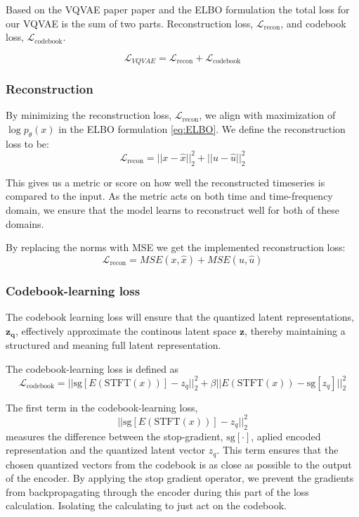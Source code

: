 Based on the VQVAE paper\cite{neuvqvae} paper and the ELBO formulation the total loss for our VQVAE is the sum of two parts. Reconstruction loss, $\mathcal{L}_{\text{recon}}$, and codebook loss, $\mathcal{L}_\text{codebook}$.

\begin{equation}
    \mathcal{L}_{VQVAE} = \mathcal{L}_\text{recon} + \mathcal{L}_\text{codebook}
    \label{eq:VQVAEloss}
\end{equation}

\subsubsection{Reconstruction}
By minimizing the reconstruction loss, $\mathcal{L}_{\text{recon}}$, we align with maximization of $\log p_\theta(x)$ in the ELBO formulation \ref{eq:ELBO}.
We define the reconstruction loss to be:
\begin{equation}
    \mathcal{L}_{\text{recon}} = ||x-\hat{x}||_2^2 + ||u-\hat{u}||_2^2
\end{equation}

This gives us a metric or score on how well the reconstructed timeseries is compared to the input. As the metric acts on both time and time-frequency domain, we ensure that the 
model learns to reconstruct well for both of these domains.

By replacing the norms with MSE we get the implemented reconstruction loss:
\begin{equation}
    \mathcal{L}_{\text{recon}} = MSE(x,\hat{x}) + MSE(u, \hat{u})
    \label{eq:recon}
\end{equation}

\subsubsection{Codebook-learning loss}
The codebook learning loss will ensure that the quantized latent representations, $\mathbf{z_q}$, effectively approximate the continous latent space $\mathbf{z}$, thereby maintaining a structured and meaning full latent representation. 

The codebook-learning loss is defined as
\begin{equation}
    \mathcal{L}_\text{codebook} = ||\text{sg}\left[ E(\text{STFT}(x))\right] - z_q||_2^2 + \beta|| E(\text{STFT}(x)) - \text{sg}\left[ z_q \right]||_2^2
    \label{eq:codebook}
\end{equation}

The first term in the codebook-learning loss,
\begin{equation}
    ||\text{sg}\left[ E(\text{STFT}(x))\right] - z_q||_2^2
\end{equation}
measures the difference between the stop-gradient, $\text{sg}\left[\cdot\right]$, aplied encoded representation and the quantized latent vector $z_q$. This term ensures that the chosen quantized vectors from the codebook is as close as possible to the output of the encoder. By applying the stop gradient operator, we prevent the gradients from backpropagating through the encoder during this part of the loss calculation.
Isolating the calculating to just act on the codebook.

